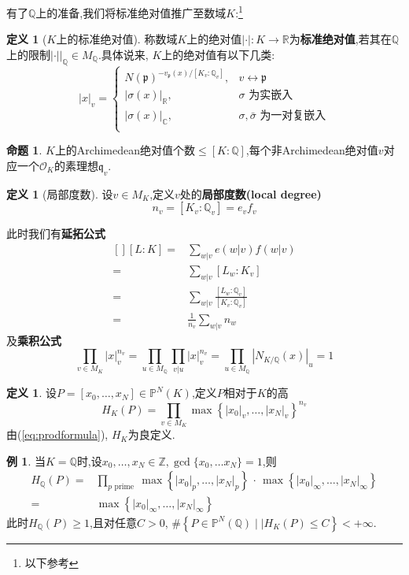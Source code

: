 \documentclass[12pt,A4paper,oneside,reqno]{amsart}
\numberwithin{equation}{section}
\theoremstyle{definition}
\newtheorem{proposition}[theorem]{命题}
\newtheorem{defn}[theorem]{定义}
\newtheorem{example}[theorem]{例}
\theoremstyle{plain}
\theoremstyle{plain}
\numberwithin{equation}{section}
\theoremstyle{remark}
\begin{document}
有了$\mathbb{Q}$上的准备,我们将标准绝对值推广至数域$K$:\footnote{以下参考\cite[p122, Proposition 10.3.2]{yichaolectures}}
\begin{defn}[$K$上的标准绝对值]
	称数域$K$上的绝对值$|\cdot|:K\longrightarrow \mathbb{R}$为\textbf{标准绝对值},若其在$\mathbb{Q}$上的限制$|\cdot|\big|_{\mathbb{Q}} \in M_{\mathbb{Q}}$.具体说来, $K$上的绝对值有以下几类:
	\begin{equation*}
		|x|_v=\begin{cases}
		N(\mathfrak{p})^{-v_{\mathfrak{p}}(x)/[K_v:\mathbb{Q}_v]}, & v \leftrightarrow \mathfrak{p}\\
		|\sigma(x)|_{\mathbb{R}},& \sigma \text{ 为实嵌入}\\
		|\sigma(x)|_{\mathbb{C}},& \sigma,\bar{\sigma} \text{ 为一对复嵌入}\\
		\end{cases}
	\end{equation*}
\end{defn}
\begin{proposition}
	$K$上的Archimedean绝对值个数$\leqslant [K:\mathbb{Q}]$,每个非Archimedean绝对值$v$对应一个$\mathcal{O}_K$的素理想$\mathfrak{q}_v$.
\end{proposition}
\begin{defn}[局部度数]
	设$v \in M_K$,定义$v$处的\textbf{局部度数(local degree)}
	$$n_v=[K_v:\mathbb{Q}_v]=e_vf_v$$
\end{defn}
此时我们有\textbf{延拓公式}
\begin{equation*}
\begin{aligned}[]
[L:K]=&\sum_{w | v}e(w|v)f(w|v)\\
=&\sum_{w | v}[L_w:K_v]\\
=&\sum_{w | v}\frac{[L_w:\mathbb{Q}_v]}{[K_v:\mathbb{Q}_v]}\\
=&\frac{1}{n_v}\sum_{w | v}n_w
\end{aligned}
\end{equation*}
及\textbf{乘积公式}
\begin{equation}\label{eq:prodformula}
\prod_{v \in M_K}|x|_v^{n_v}=\prod_{u \in M_\mathbb{Q}}\prod_{v|u}|x|_v^{n_v}=\prod_{u \in M_\mathbb{Q}}|N_{K/\mathbb{Q}}(x)|_u=1
\end{equation}
\begin{defn}
	设$P=[x_0, \ldots, x_N] \in \mathbb{P}^N(K)$,定义$P$相对于$K$的高
	$$H_K(P)=\prod_{v \in M_K} \max \left\{|x_0|_v, \ldots , |x_N|_v \right\}^{n_v}$$
	由(\ref{eq:prodformula}), $H_K$为良定义.
\end{defn}
\begin{example}
	当$K=\mathbb{Q}$时,设$x_0,\ldots,x_N \in \mathbb{Z}, \gcd 
\{x_0, \ldots x_N\}=1$,则
\begin{equation*}
\begin{aligned}
H_{\mathbb{Q}}(P)=&\prod_{p \text{ prime }}\max \left\{|x_0|_p, \ldots , |x_N|_p \right\}\,\cdot \,\max\left\{|x_0|_{\infty}, \ldots , |x_N|_{\infty} \right\}\\
=&\max\left\{|x_0|_{\infty}, \ldots , |x_N|_{\infty} \right\}
\end{aligned}
\end{equation*}
此时$H_{\mathbb{Q}}(P) \geqslant 1$,且对任意$C>0$, $\#\left\{P \in \mathbb{P}^N(\mathbb{Q}) \mid| H_K(P)\leqslant C \right\}<+\infty$.
\end{example}
\end{document}
